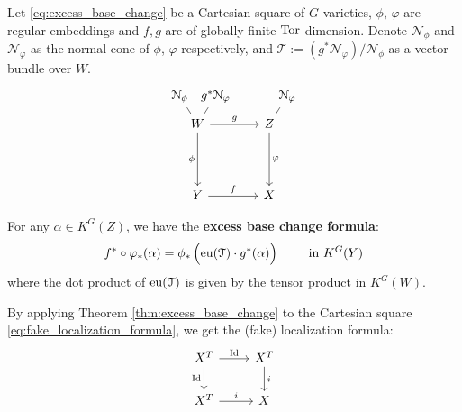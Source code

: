 \begin{theorem}\label{thm:excess_base_change}
Let \eqref{eq:excess_base_change} be a Cartesian square of $G$-varieties, $\phi$, $\varphi$ are regular embeddings and $f,g$ are of globally finite $\operatorname{\operatorname{Tor}}$-dimension. Denote $\mathcal{N}_{\phi}$ and $\mathcal{N}_{\varphi}$ as the normal cone of $\phi$, $\varphi$ respectively, and $\mathcal{T}:=(g^{*}\mathcal{N}_{\varphi})/\mathcal{N}_{\phi}$ as a vector bundle over $W$.
\begin{equation}\label{eq:excess_base_change}
\begin{tikzcd}[row sep={between origins,20mm},column sep={between origins,5mm}]
	{\mathcal{N}_{\phi}} && {g^{*}\mathcal{N}_{\varphi}} &[10mm]& {\mathcal{N}_{\varphi}} \\[-12mm]
	& W && Z \\
	& Y && X
	\arrow["f", from=3-2, to=3-4]
	\arrow["\varphi", from=2-4, to=3-4]
	\arrow["g", from=2-2, to=2-4]
	\arrow["\phi"', from=2-2, to=3-2]
	\arrow[no head, from=1-5, to=2-4]
	\arrow[no head, from=1-3, to=2-2]
	\arrow[no head, from=1-1, to=2-2]
\end{tikzcd}
\end{equation}

For any $\alpha \in K^G(Z)$, we have the \textbf{excess base change formula}:
$$f^* \circ \varphi_{*}(\alpha)=\phi_{*} \left( \eu(\mathcal{T})\cdot g^*(\alpha)\rule{0mm}{4mm}  \right) \qquad \text{ in }K^{G}(Y)$$
where the dot product of $\operatorname{\operatorname{eu}}(\mathcal{T})$ is given by the tensor product in $K^G(W)$.

\end{theorem}

By applying Theorem \ref{thm:excess_base_change} to the Cartesian square \eqref{eq:fake_localization_formula}, we get the (fake) localization formula:
\begin{equation}\label{eq:fake_localization_formula}
\begin{tikzcd}
	{X^T} & {X^T} \\
	{X^T} & X
	\arrow["i", from=1-2, to=2-2]
	\arrow["i", from=2-1, to=2-2]
	\arrow["\Id", from=1-1, to=1-2]
	\arrow["\Id"', from=1-1, to=2-1]
\end{tikzcd}
\end{equation}

